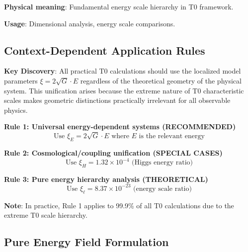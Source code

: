 \documentclass[12pt,a4paper]{article}
\begin{document}
\textbf{Physical meaning}: Fundamental energy scale hierarchy in T0 framework.

\textbf{Usage}: Dimensional analysis, energy scale comparisons.

\subsection{Context-Dependent Application Rules}
\label{subsec:context_rules}

\begin{tcolorbox}[colback=orange!5!white,colframe=orange!75!black,title=Universal T0 Calculation Method]
	\textbf{Key Discovery}: All practical T0 calculations should use the localized model parameters $\xi = 2\sqrt{G} \cdot E$ regardless of the theoretical geometry of the physical system. This unification arises because the extreme nature of T0 characteristic scales makes geometric distinctions practically irrelevant for all observable physics.
\end{tcolorbox}

\begin{tcolorbox}[colback=blue!5!white,colframe=blue!75!black,title=Application Rules for $\xi$ Parameters (Pure Energy)]
	\textbf{Rule 1: Universal energy-dependent systems (RECOMMENDED)}
	\begin{equation}
		\text{Use } \xi_E = 2\sqrt{G} \cdot E \text{ where } E \text{ is the relevant energy}
	\end{equation}
	
	\textbf{Rule 2: Cosmological/coupling unification (SPECIAL CASES)}
	\begin{equation}
		\text{Use } \xi_H = 1.32 \times 10^{-4} \text{ (Higgs energy ratio)}
	\end{equation}
	
	\textbf{Rule 3: Pure energy hierarchy analysis (THEORETICAL)}
	\begin{equation}
		\text{Use } \xi_\ell = 8.37 \times 10^{-23} \text{ (energy scale ratio)}
	\end{equation}
	
	\textbf{Note}: In practice, Rule 1 applies to 99.9\% of all T0 calculations due to the extreme T0 scale hierarchy.
\end{tcolorbox}

\subsection{Pure Energy Field Formulation}
\label{subsec:pure_energy_field}
\end{document}
